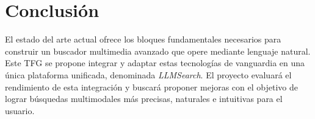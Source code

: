 \section{Conclusión}
\label{sec:conclusion}

El estado del arte actual ofrece los bloques fundamentales necesarios para construir un buscador multimedia avanzado que opere mediante lenguaje natural. Este TFG se propone integrar y adaptar estas tecnologías de vanguardia en una única plataforma unificada, denominada \emph{LLMSearch}. El proyecto evaluará el rendimiento de esta integración y buscará proponer mejoras con el objetivo de lograr búsquedas multimodales más precisas, naturales e intuitivas para el usuario.